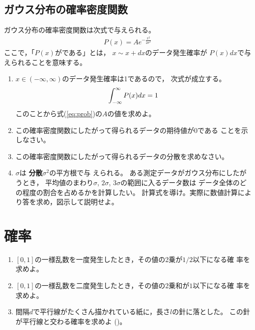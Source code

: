 \documentclass[twocolumn,11pt]{jarticle}
\begin{document}
\subsection{ガウス分布の確率密度関数}
ガウス分布の確率密度関数は次式で与えられる。
\begin{align}
  \label{eq:prob}
  P(x)=Ae^{-\frac{x^2}{2\sigma^2}}
\end{align}
ここで，「$P(x)$がである」とは，
$x\sim x+dx$のデータ発生確率が
$P(x)dx$で与えられることを意味する。
\begin{enumerate}
\item $x\in (-\infty,\infty)$のデータ発生確率は1であるので，
  次式が成立する。
  \begin{align}
    \int_{-\infty}^{\infty} P(x)dx=1\notag
  \end{align}
  このことから式(\ref{eq:prob})の$A$の値を求めよ。
\item この確率密度関数にしたがって得られるデータの期待値が$0$である
  ことを示しなさい。
\item この確率密度関数にしたがって得られるデータの分散を求めなさい。
\item {}$\sigma$は
  \textbf{分散}$\sigma^2$の平方根で与
  えられる。 ある測定データがガウス分布にしたがうとき，
  平均値のまわり$\sigma$, $2\sigma$, $3\sigma$の範囲に入るデータ数は
  データ全体のどの程度の割合を占めるかを計算したい。
  計算式を導け。実際に数値計算により答を求め，図示して説明せよ。
\end{enumerate}


\section{確率}
\begin{enumerate}
\item 
  $[0,1]$の一様乱数を一度発生したとき，その値の2乗が$1/2$以下になる確
  率を求めよ。
\item 
  $[0,1]$の一様乱数を二度発生したとき，その値の2乗和が$1$以下になる確
  率を求めよ。
\item 間隔$d$で平行線がたくさん描かれている紙に，長さ$l$の針に落とした。
  この針が平行線と交わる確率を求めよ
  ()。
\end{enumerate}
\end{document}
